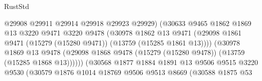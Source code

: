 \begin{lexlean}{RustStd}
\begin{coremodule}
                                          @29908
                                          @29911
                                          @29914
                                          @29918
                                          @29923
                                          @29929)
                                        (@30633
                                          @9465
                                          @1862
                                          @1869
                                          @13
                                          @3220
                                          @9471
                                          @3220
                                          @9478
                                          (@30978
                                            @1862
                                            @13
                                            @9471
                                            (@29098
                                              @1861
                                              @9471
                                              (@15279 (@15280 @9471))
                                              (@13759 (@15285 @1861 @13))))
                                          (@30978
                                            @1869
                                            @13
                                            @9478
                                            (@29098
                                              @1868
                                              @9478
                                              (@15279 (@15280 @9478))
                                              (@13759 (@15285 @1868 @13))))))
                                      (@30568
                                        @1877
                                        @1884
                                        @1891
                                        @13
                                        @9506
                                        @9515
                                        @3220
                                        @9530
                                        (@30579
                                          @1876
                                          @1014
                                          @18769
                                          @9506
                                          @9513
                                          @8669
                                          (@30588
                                            @1875
                                            @53

\end{coremodule}
\end{lexlean}
